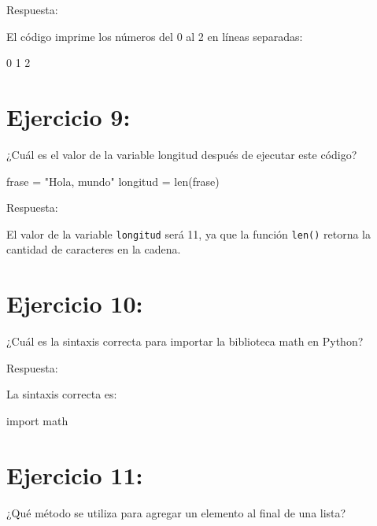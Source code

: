 \documentclass[
  a4paper,
  DIV=11,
  numbers=noendperiod,
  onepage,
  openany]{scrreprt}
\newenvironment{Shaded}{\begin{snugshade}}{\end{snugshade}}
\newcommand{\BuiltInTok}[1]{\textcolor[rgb]{0.00,0.23,0.31}{#1}}
\newcommand{\ExtensionTok}[1]{\textcolor[rgb]{0.00,0.23,0.31}{#1}}
\newcommand{\ImportTok}[1]{\textcolor[rgb]{0.00,0.46,0.62}{#1}}
\newcommand{\NormalTok}[1]{\textcolor[rgb]{0.00,0.23,0.31}{#1}}
\newcommand{\OperatorTok}[1]{\textcolor[rgb]{0.37,0.37,0.37}{#1}}
\newcommand{\StringTok}[1]{\textcolor[rgb]{0.13,0.47,0.30}{#1}}
\begin{document}
Respuesta:

El código imprime los números del 0 al 2 en líneas separadas:

\begin{Shaded}
\begin{Highlighting}[]
\ExtensionTok{0}
\ExtensionTok{1}
\ExtensionTok{2}
\end{Highlighting}
\end{Shaded}

\chapter{Ejercicio 9:}\label{ejercicio-9}

¿Cuál es el valor de la variable longitud después de ejecutar este
código?

\begin{Shaded}
\begin{Highlighting}[]
\NormalTok{frase }\OperatorTok{=} \StringTok{"Hola, mundo"}
\NormalTok{longitud }\OperatorTok{=} \BuiltInTok{len}\NormalTok{(frase)}
\end{Highlighting}
\end{Shaded}

Respuesta:

El valor de la variable \texttt{longitud} será 11, ya que la función
\texttt{len()} retorna la cantidad de caracteres en la cadena.

\chapter{Ejercicio 10:}\label{ejercicio-10}

¿Cuál es la sintaxis correcta para importar la biblioteca math en
Python?

Respuesta:

La sintaxis correcta es:

\begin{Shaded}
\begin{Highlighting}[]
\ImportTok{import}\NormalTok{ math}
\end{Highlighting}
\end{Shaded}

\chapter{Ejercicio 11:}\label{ejercicio-11}

¿Qué método se utiliza para agregar un elemento al final de una lista?
\end{document}
